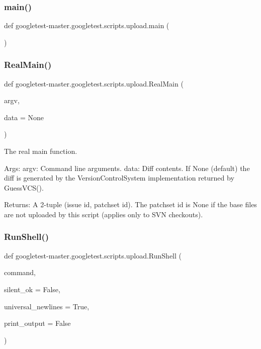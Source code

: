 \subsubsection{\texorpdfstring{main()}{main()}}
{\footnotesize\ttfamily def googletest-\/master.\+googletest.\+scripts.\+upload.\+main (\begin{DoxyParamCaption}{ }\end{DoxyParamCaption})}

\mbox{\label{namespacegoogletest-master_1_1googletest_1_1scripts_1_1upload_aea6912f6c8d4ffe5ed77db72b0798481}} 
\subsubsection{\texorpdfstring{RealMain()}{RealMain()}}
{\footnotesize\ttfamily def googletest-\/master.\+googletest.\+scripts.\+upload.\+Real\+Main (\begin{DoxyParamCaption}\item[{}]{argv,  }\item[{}]{data = {\ttfamily None} }\end{DoxyParamCaption})}

\begin{DoxyVerb}The real main function.

Args:
  argv: Command line arguments.
  data: Diff contents. If None (default) the diff is generated by
    the VersionControlSystem implementation returned by GuessVCS().

Returns:
  A 2-tuple (issue id, patchset id).
  The patchset id is None if the base files are not uploaded by this
  script (applies only to SVN checkouts).
\end{DoxyVerb}
 \mbox{\label{namespacegoogletest-master_1_1googletest_1_1scripts_1_1upload_ab6e7c7fa8d930c338d7fb3658871ad7e}} 
\subsubsection{\texorpdfstring{RunShell()}{RunShell()}}
{\footnotesize\ttfamily def googletest-\/master.\+googletest.\+scripts.\+upload.\+Run\+Shell (\begin{DoxyParamCaption}\item[{}]{command,  }\item[{}]{silent\+\_\+ok = {\ttfamily False},  }\item[{}]{universal\+\_\+newlines = {\ttfamily True},  }\item[{}]{print\+\_\+output = {\ttfamily False} }\end{DoxyParamCaption})}

